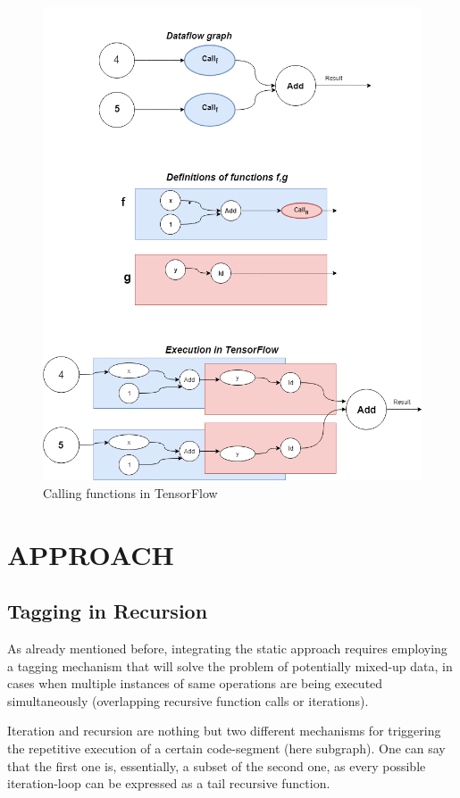 \documentclass[ack,preface]{dithesis}
\begin{document}
\begin{figure}
\centering
\includegraphics[scale=0.6]{figures/Tf_recursion}
\caption{ Calling functions in TensorFlow}
\end{figure}


\chapter{APPROACH}

    \section{Tagging in Recursion}

As already mentioned before, integrating the static approach requires employing a tagging mechanism that will solve the problem of potentially mixed-up data, in cases when multiple instances of same operations are being executed simultaneously (overlapping recursive function calls or iterations).

Iteration and recursion are nothing but two different mechanisms for triggering the repetitive execution of a certain code-segment (here subgraph). One can say that the first one is, essentially, a subset of the second one, as every possible iteration-loop can be expressed as a tail recursive function. 
\end{document}
